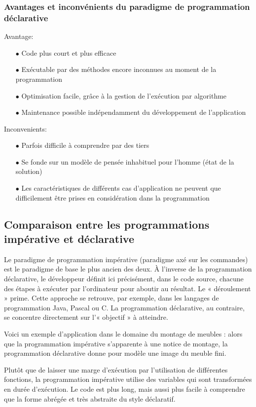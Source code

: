 \documentclass[a4paper,12pt]{article} %
\begin{document}
\subsubsection{Avantages et inconvénients du paradigme de programmation déclarative}

Avantage:
\begin{itemize}
   \item[$\bullet$]Code plus court et plus efficace
   \item[$\bullet$]Exécutable par des méthodes encore inconnues au moment de la programmation
   \item[$\bullet$]Optimisation facile, grâce à la gestion de l’exécution par algorithme
   \item[$\bullet$]Maintenance possible indépendamment du développement de l’application
\end{itemize}

Inconvenients:
\begin{itemize}
\item[$\bullet$]Parfois difficile à comprendre par des tiers
\item[$\bullet$]Se fonde sur un modèle de pensée inhabituel pour l’homme (état de la solution)
\item[$\bullet$]Les caractéristiques de différents cas d’application ne peuvent que difficilement être prises en considération dans la programmation
\end{itemize}

\subsection{Comparaison entre les programmations impérative et déclarative}

Le paradigme de programmation impérative (paradigme axé sur les commandes) est le paradigme de base le plus ancien des deux. À l’inverse de la programmation déclarative, le développeur définit ici précisément, dans le code source, chacune des étapes à exécuter par l’ordinateur pour aboutir au résultat. Le « déroulement » prime. Cette approche se retrouve, par exemple, dans les langages de programmation Java, Pascal ou C. La programmation déclarative, au contraire, se concentre directement sur l’« objectif » à atteindre.

Voici un exemple d’application dans le domaine du montage de meubles : alors que la programmation impérative s’apparente à une notice de montage, la programmation déclarative donne pour modèle une image du meuble fini.

Plutôt que de laisser une marge d’exécution par l’utilisation de différentes fonctions, la programmation impérative utilise des variables qui sont transformées en durée d’exécution. Le code est plus long, mais aussi plus facile à comprendre que la forme abrégée et très abstraite du style déclaratif.
\end{document}
